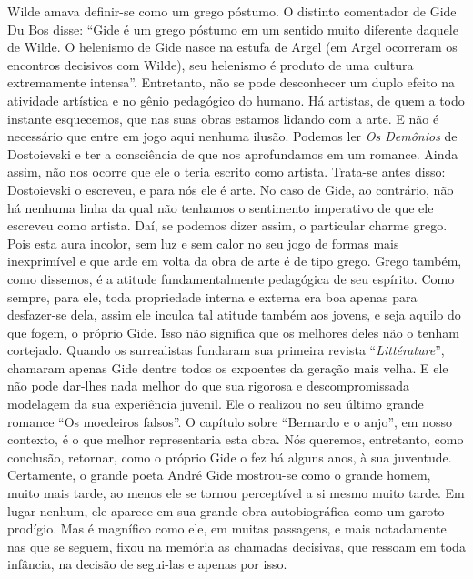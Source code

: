 Wilde amava definir-se como um grego póstumo. O distinto comentador de
Gide Du Bos disse: ``Gide é um grego póstumo em um sentido muito
diferente daquele de Wilde. O helenismo de Gide nasce na estufa de Argel
(em Argel ocorreram os encontros decisivos com Wilde), seu helenismo é
produto de uma cultura extremamente intensa''. Entretanto, não se pode
desconhecer um duplo efeito na atividade artística e no gênio pedagógico
do humano. Há artistas, de quem a todo instante esquecemos, que nas suas
obras estamos lidando com a arte. E não é necessário que entre em jogo
aqui nenhuma ilusão. Podemos ler \emph{Os Demônios} de Dostoievski e ter
a consciência de que nos aprofundamos em um romance. Ainda assim, não
nos ocorre que ele o teria escrito como artista. Trata-se antes disso:
Dostoievski o escreveu, e para nós ele é arte. No caso de Gide, ao
contrário, não há nenhuma linha da qual não tenhamos o sentimento
imperativo de que ele escreveu como artista. Daí, se podemos dizer
assim, o particular charme grego. Pois esta aura incolor, sem luz e sem
calor no seu jogo de formas mais inexprimível e que arde em volta da
obra de arte é de tipo grego. Grego também, como dissemos, é a atitude
fundamentalmente pedagógica de seu espírito. Como sempre, para ele, toda
propriedade interna e externa era boa apenas para desfazer-se dela,
assim ele inculca tal atitude também aos jovens, e seja aquilo do que
fogem, o próprio Gide. Isso não significa que os melhores deles não o
tenham cortejado. Quando os surrealistas fundaram sua primeira revista
``\emph{Littérature}'', chamaram apenas Gide dentre todos os expoentes
da geração mais velha. E ele não pode dar-lhes nada melhor do que sua
rigorosa e descompromissada modelagem da sua experiência juvenil. Ele o
realizou no seu último grande romance ``Os moedeiros falsos''. O
capítulo sobre ``Bernardo e o anjo'', em nosso contexto, é o que melhor
representaria esta obra. Nós queremos, entretanto, como conclusão,
retornar, como o próprio Gide o fez há alguns anos, à sua juventude.
Certamente, o grande poeta André Gide mostrou-se como o grande homem,
muito mais tarde, ao menos ele se tornou perceptível a si mesmo muito
tarde. Em lugar nenhum, ele aparece em sua grande obra autobiográfica
como um garoto prodígio. Mas é magnífico como ele, em muitas passagens,
e mais notadamente nas que se seguem, fixou na memória as chamadas
decisivas, que ressoam em toda infância, na decisão de segui-las e
apenas por isso.

